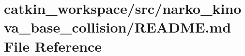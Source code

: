 \hypertarget{deliverables_2doxygen_2catkin__workspace_2src_2narko__kinova__base__collision_2_r_e_a_d_m_e_8md}{}\section{catkin\+\_\+workspace/src/narko\+\_\+kinova\+\_\+base\+\_\+collision/\+R\+E\+A\+D\+ME.md File Reference}
\label{deliverables_2doxygen_2catkin__workspace_2src_2narko__kinova__base__collision_2_r_e_a_d_m_e_8md}
